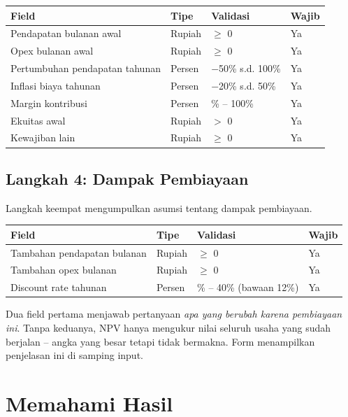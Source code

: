 \documentclass[12pt,a4paper,twoside]{report}
\begin{document}
\begin{longtable}{@{}p{4cm}>{\raggedright\arraybackslash}p{3cm}>{\raggedright\arraybackslash}p{4cm}>{\raggedright\arraybackslash}p{2cm}@{}}
\toprule
\textbf{Field} & \textbf{Tipe} & \textbf{Validasi} & \textbf{Wajib} \\
\midrule
\endhead
Pendapatan bulanan awal & Rupiah & $\ge$ 0 & Ya \\
Opex bulanan awal & Rupiah & $\ge$ 0 & Ya \\
Pertumbuhan pendapatan tahunan & Persen & $-$50\% s.d. 100\% & Ya \\
Inflasi biaya tahunan & Persen & $-$20\% s.d. 50\% & Ya \\
Margin kontribusi & Persen & 1\% -- 100\% & Ya \\
Ekuitas awal & Rupiah & $>$ 0 & Ya \\
Kewajiban lain & Rupiah & $\ge$ 0 & Ya \\
\bottomrule
\end{longtable}

\section{Langkah 4: Dampak Pembiayaan}

Langkah keempat mengumpulkan asumsi tentang dampak pembiayaan.

\begin{longtable}{@{}p{4cm}>{\raggedright\arraybackslash}p{3cm}>{\raggedright\arraybackslash}p{4cm}>{\raggedright\arraybackslash}p{2cm}@{}}
\toprule
\textbf{Field} & \textbf{Tipe} & \textbf{Validasi} & \textbf{Wajib} \\
\midrule
\endhead
Tambahan pendapatan bulanan & Rupiah & $\ge$ 0 & Ya \\
Tambahan opex bulanan & Rupiah & $\ge$ 0 & Ya \\
Discount rate tahunan & Persen & 0\% -- 40\% (bawaan 12\%) & Ya \\
\bottomrule
\end{longtable}

Dua field pertama menjawab pertanyaan \emph{apa yang berubah karena pembiayaan ini}. Tanpa keduanya, NPV hanya mengukur nilai seluruh usaha yang sudah berjalan -- angka yang besar tetapi tidak bermakna. Form menampilkan penjelasan ini di samping input.

\chapter{Memahami Hasil}
\end{document}
